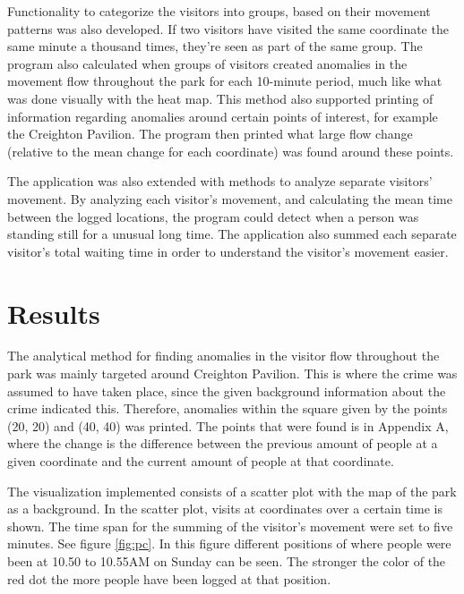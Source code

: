 \documentclass[journal]{vgtc}                %
\begin{document}
Functionality to categorize the visitors into groups, based on their movement patterns was also developed. If two visitors have visited the same coordinate the same minute a thousand times, they're seen as part of the same group. The program also calculated when groups of visitors created anomalies in the movement flow throughout the park for each 10-minute period, much like what was done visually with the heat map. This method also supported printing of information regarding anomalies around certain points of interest, for example the Creighton Pavilion. The program then printed what large flow change (relative to the mean change for each coordinate) was found around these points.

The application was also extended with methods to analyze separate visitors' movement. By analyzing each visitor's movement, and calculating the mean time between the logged locations, the program could detect when a person was standing still for a unusual long time. The application also summed each separate visitor's total waiting time in order to understand the visitor's movement easier.


\section{Results}
The analytical method for finding anomalies in the visitor flow throughout the park was mainly targeted around Creighton Pavilion. This is where the crime was assumed to have taken place, since the given background information about the crime indicated this. Therefore, anomalies within the square given by the points (20, 20) and (40, 40) was printed. The points that were found is in Appendix A, where the change is the difference between the previous amount of people at a given coordinate and the current amount of people at that coordinate.

The visualization implemented consists of a scatter plot with the map of the park as a background. In the scatter plot, visits at coordinates over a certain time is shown. The time span for the summing of the visitor's movement were set to five minutes. See figure \ref{fig:pc}. In this figure different positions of where people were been at 10.50 to 10.55AM on Sunday can be seen. The stronger the color of the red dot the more people have been logged at that position.
\end{document}
